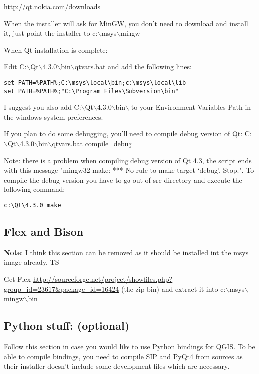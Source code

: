 \url{http://qt.nokia.com/downloads}

When the installer will ask for MinGW, you don't need to download and install
it, just point the installer to c:$\backslash$msys$\backslash$mingw

When Qt installation is complete:

Edit C:$\backslash$Qt$\backslash$4.3.0$\backslash$bin$\backslash$qtvars.bat and add the following lines:

\begin{verbatim}
set PATH=%PATH%;C:\msys\local\bin;c:\msys\local\lib 
set PATH=%PATH%;"C:\Program Files\Subversion\bin" 
\end{verbatim}

I suggest you also add C:$\backslash$Qt$\backslash$4.3.0$\backslash$bin$\backslash$ to your Environment Variables Path in
the windows system preferences.

If you plan to do some debugging, you'll need to compile debug version of Qt:
C:$\backslash$Qt$\backslash$4.3.0$\backslash$bin$\backslash$qtvars.bat compile\_debug

Note: there is a problem when compiling debug version of Qt 4.3, the script ends with
this message  "mingw32-make: *** No rule to make target `debug'.  Stop.". To 
compile the debug version you have to go out of src directory and execute the
following command:

\begin{verbatim}
c:\Qt\4.3.0 make 
\end{verbatim}

\subsection{Flex and Bison}

\textbf{Note}:  I think this section can be removed as it should be installed int the
msys image already. TS

Get Flex
\url{http://sourceforge.net/project/showfiles.php?group\_id=23617&package\_id=16424}
(the zip bin) and extract it into c:$\backslash$msys$\backslash$mingw$\backslash$bin

\subsection{Python stuff: (optional)}
Follow this section in case you would like to use Python bindings for QGIS.  To
be able to compile bindings, you need to compile SIP and PyQt4 from sources as
their installer doesn't include some development files which are necessary.

